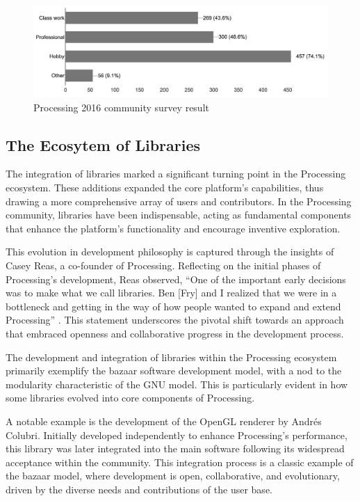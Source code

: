 \begin{figure}[h!]
	\centering
	\includegraphics[width=\textwidth]{images/community-survey.png}
	\caption[Processing 2016 community survey]{Processing 2016 community survey result \parencite{processingfoundation2016CommunitySurvey2016}}
	\label{fig:community_survey}
\end{figure}

\subsection{The Ecosytem of Libraries}
The integration of libraries marked a significant turning point in the Processing ecosystem. These additions expanded the core platform’s capabilities, thus drawing a more comprehensive array of users and contributors. In the Processing community, libraries have been indispensable, acting as fundamental components that enhance the platform’s functionality and encourage inventive exploration.

This evolution in development philosophy is captured through the insights of Casey Reas, a co-founder of Processing. Reflecting on the initial phases of Processing’s development, Reas observed, \enquote{One of the important early decisions was to make what we call libraries. Ben [Fry] and I realized that we were in a bottleneck and getting in the way of how people wanted to expand and extend Processing} \parencite[329]{conradGraphicDesignPostdigital2021}. This statement underscores the pivotal shift towards an approach that embraced openness and collaborative progress in the development process.

The development and integration of libraries within the Processing ecosystem primarily exemplify the bazaar software development model, with a nod to the modularity characteristic of the GNU model. This is particularly evident in how some libraries evolved into core components of Processing.

A notable example is the development of the OpenGL renderer by Andrés Colubri. Initially developed independently to enhance Processing’s performance, this library was later integrated into the main software following its widespread acceptance within the community. This integration process is a classic example of the bazaar model, where development is open, collaborative, and evolutionary, driven by the diverse needs and contributions of the user base.  \parencite{fryProcessingContributionGuide2022}

